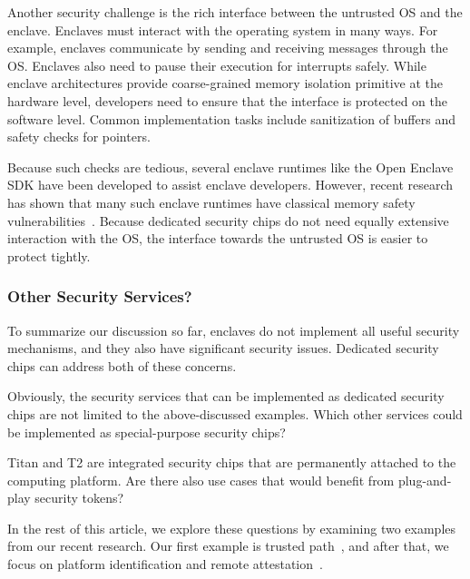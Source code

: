Another security challenge is the rich interface between the untrusted OS and the enclave. Enclaves must interact with the operating system in many ways. For example, enclaves communicate by sending and receiving messages through the OS. Enclaves also need to pause their execution for interrupts safely. While enclave architectures provide coarse-grained memory isolation primitive at the hardware level, developers need to ensure that the interface is protected on the software level. Common implementation tasks include sanitization of buffers and safety checks for pointers. 

Because such checks are tedious, several enclave runtimes like the Open Enclave SDK have been developed to assist enclave developers. However, recent research has shown that many such enclave runtimes have classical memory safety vulnerabilities~\cite{van2019tale}. Because dedicated security chips do not need equally extensive interaction with the OS, the interface towards the untrusted OS is easier to protect tightly. 


\subsubsection*{Other Security Services?}

To summarize our discussion so far, enclaves do not implement all useful security mechanisms, and they also have significant security issues. Dedicated security chips can address both of these concerns. 

Obviously, the security services that can be implemented as dedicated security chips are not limited to the above-discussed examples. Which other services could be implemented as special-purpose security chips? 

Titan and T2 are integrated security chips that are permanently attached to the computing platform. Are there also use cases that would benefit from plug-and-play security tokens?

In the rest of this article, we explore these questions by examining two examples from our recent research. Our first example is trusted path~\cite{protection}, %
and after that, we focus on platform identification and remote attestation~\cite{proximitee}. 
